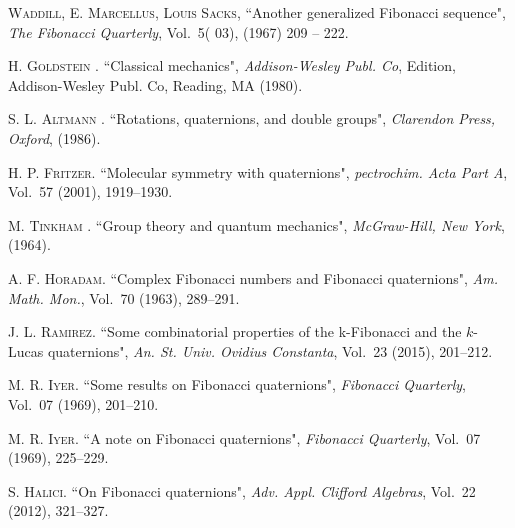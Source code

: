\begin{thebibliography}{00}
\textsc{ Waddill, E. Marcellus, Louis Sacks, } {``Another generalized Fibonacci sequence"}, \emph{The Fibonacci Quarterly}, Vol.~{5( 03)}, (1967) 209 -- 222.%

\textsc{ H. Goldstein }. {``Classical mechanics"}, \emph{Addison-Wesley Publ. Co}, Edition, Addison-Wesley Publ. Co, Reading, MA (1980).%

\textsc{ S. L. Altmann }. {``Rotations, quaternions, and double groups"}, \emph{Clarendon Press, Oxford}, (1986).%

\textsc{H. P. Fritzer}. {``Molecular symmetry with quaternions"}, \emph{pectrochim. Acta Part A}, Vol.~{57} (2001), 1919--1930.%

{\textsc{ M.  Tinkham }. {``Group theory and quantum mechanics"}, \emph{McGraw-Hill, New York}, (1964). \url{}}

{\textsc{A. F. Horadam}. {``Complex Fibonacci numbers and Fibonacci quaternions"}, \emph{Am. Math. Mon.}, Vol.~{70} (1963), 289--291. \url{}}

\textsc{J. L. Ramirez}. {``Some combinatorial properties of the k-Fibonacci and the $k$-Lucas quaternions"}, \emph{An. St. Univ. Ovidius Constanta}, Vol.~{23} (2015), 201--212.%

\textsc{M. R. Iyer}. {``Some results on Fibonacci quaternions"}, \emph{Fibonacci Quarterly}, Vol.~{07} (1969), 201--210.%

\textsc{M. R. Iyer}. {``A note on Fibonacci quaternions"}, \emph{Fibonacci Quarterly}, Vol.~{07} (1969), 225--229.%

\textsc{S. Halici}. {``On Fibonacci quaternions"}, \emph{Adv. Appl. Clifford Algebras}, Vol.~{22} (2012), 321--327.%


\end{thebibliography}
